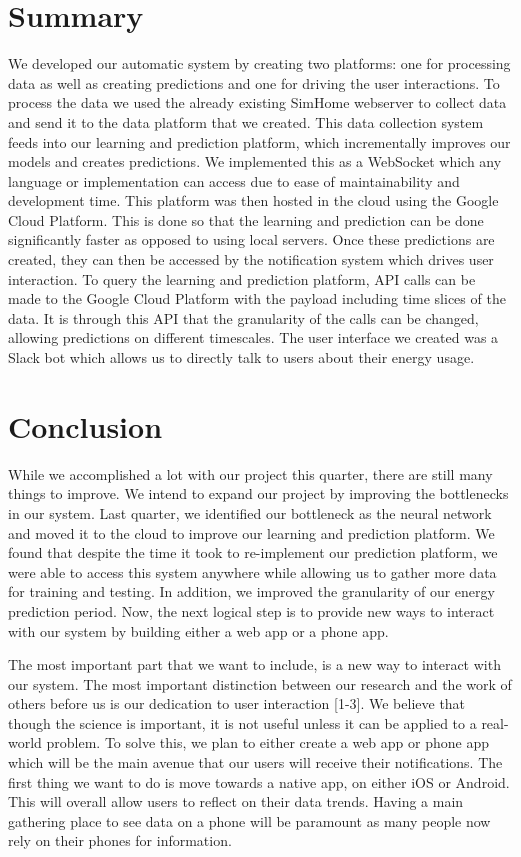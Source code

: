 \documentclass[conference]{IEEEtran}
\begin{document}
\section*{Summary}
We developed our automatic system by creating two platforms: one for processing data as well as creating predictions and one for driving the user interactions. To process the data we used the already existing SimHome webserver to collect data and send it to the data platform that we created. This data collection system feeds into our learning and prediction platform, which incrementally improves our models and creates predictions. We implemented this as a WebSocket which any language or implementation can access due to ease of maintainability and development time. This platform was then hosted in the cloud using the Google Cloud Platform. This is done so that the learning and prediction can be done significantly faster as opposed to using local servers. Once these predictions are created, they can then be accessed by the notification system which drives user interaction. To query the learning and prediction platform, API calls can be made to the Google Cloud Platform with the payload including time slices of the data. It is through this API that the granularity of the calls can be changed, allowing predictions on different timescales. The user interface we created was a Slack bot which allows us to directly talk to users about their energy usage.

\section*{Conclusion}
While we accomplished a lot with our project this quarter, there are still many things to improve. We intend to expand our project by improving the bottlenecks in our system. Last quarter, we identified our bottleneck as the neural network and moved it to the cloud to improve our learning and prediction platform. We found that despite the time it took to re-implement our prediction platform, we were able to access this system anywhere while allowing us to gather more data for training and testing. In addition, we improved the granularity of our energy prediction period. Now, the next logical step is to provide new ways to interact with our system by building either a web app or a phone app. 

The most important part that we want to include, is a new way to interact with our system. The most important distinction between our research and the work of others before us is our dedication to user interaction [1-3]. We believe that though the science is important, it is not useful unless it can be applied to a real-world problem. To solve this, we plan to either create a web app or phone app which will be the main avenue that our users will receive their notifications. The first thing we want to do is move towards a native app, on either iOS or Android. This will overall allow users to reflect on their data trends. Having a main gathering place to see data on a phone will be paramount as many people now rely on their phones for information.
\end{document}
